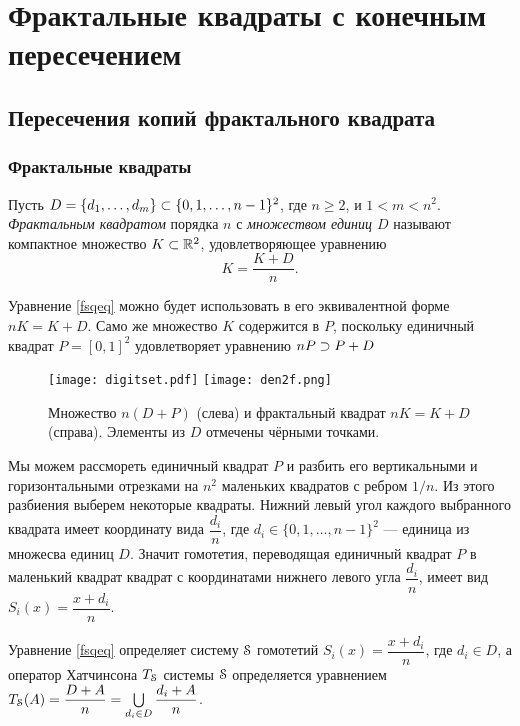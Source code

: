 \newpage
\chapter{Фрактальные квадраты с конечным пересечением}


\section{Пересечения копий фрактального квадрата}


\subsection{Фрактальные квадраты}

\begin{definition}\label{dfn:FS} 
Пусть $D=\{d_1,\ldots,d_m\}\subset\{0,1,\ldots,n-1\}^2$, где $n\ge 2$, и $1<m<n^2$.
{\em Фрактальным квадратом} порядка $n$ с {\em множеством единиц $D$} называют компактное множество $K\subset\mathbb{R}^2$, удовлетворяющее уравнению
\begin{equation}\label{fsqeq}
K=\dfrac{K+D}{n}.
\end{equation}
\end{definition}

Уравнение \eqref{fsqeq} можно будет использовать в его эквивалентной форме $nK=K+D$.
Само же множество $K$ содержится в $P$, поскольку единичный квадрат $P=[0,1]^2$ удовлетворяет уравнению $nP\supset P+D$

\begin{figure}[H]
 \centering
 \texttt{[image: digitset.pdf]}
 \hfill
 \texttt{[image: den2f.png]}
 \caption{Множество $n(D+P)$ (слева) и фрактальный квадрат $nK=K+D$ (справа). Элементы из $D$ отмечены чёрными точками.}
 \label{fig:fr_sq}
\end{figure}

Мы можем рассмореть единичный квадрат $P$ и разбить его вертикальными и горизонтальными отрезками на $n^2$ маленьких квадратов с ребром $1/n$.
Из этого разбиения выберем некоторые квадраты.
Нижний левый угол каждого выбранного квадрата имеет координату вида $\dfrac{d_i}{n}$, где $d_i\in\{0,1,\ldots,n-1\}^2$ --- единица из множесва единиц $D$.
Значит гомотетия, переводящая единичный квадрат $P$ в маленький квадрат квадрат с координатами нижнего левого угла $\dfrac{d_i}{n}$, имеет вид $S_i(x)=\dfrac{x+d_i}{n}$.

Уравнение \eqref{fsqeq} определяет систему ${\EuScript S}$ гомотетий $S_i(x)=\dfrac{x+d_i}{n}$, где $d_i\in D$, а оператор Хатчинсона $T_{\EuScript S}$ системы ${\EuScript S}$ определяется уравнением $T_{\EuScript S}(A)=\dfrac{D+A}{n}=\bigcup\limits_{d_i\in D}\dfrac{d_i+A}{n}$.

